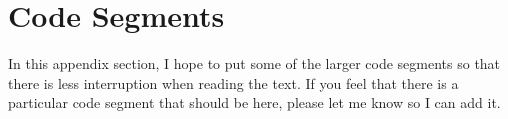 \chapter{Code Segments}\label{app:CodeSegments}

In this appendix section, I hope to put some of the larger code segments so that there is less interruption when reading the text.
If you feel that there is a particular code segment that should be here, please let me know so I can add it.